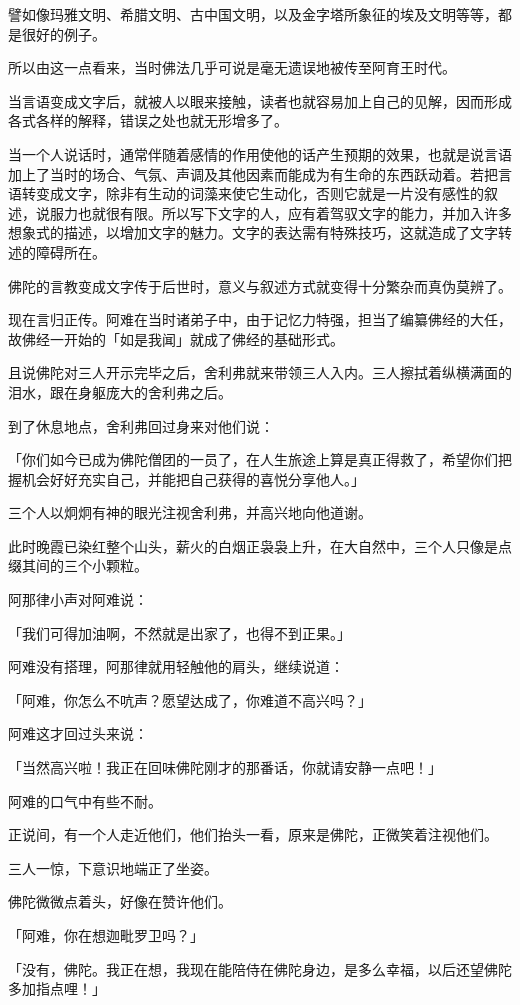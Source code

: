 \documentclass[twoside,openany]{book}
\begin{document}
譬如像玛雅文明、希腊文明、古中国文明，以及金字塔所象征的埃及文明等等，都是很好的例子。

所以由这一点看来，当时佛法几乎可说是毫无遗误地被传至阿育王时代。

当言语变成文字后，就被人以眼来接触，读者也就容易加上自己的见解，因而形成各式各样的解释，错误之处也就无形增多了。

当一个人说话时，通常伴随着感情的作用使他的话产生预期的效果，也就是说言语加上了当时的场合、气氛、声调及其他因素而能成为有生命的东西跃动着。若把言语转变成文字，除非有生动的词藻来使它生动化，否则它就是一片没有感性的叙述，说服力也就很有限。所以写下文字的人，应有着驾驭文字的能力，并加入许多想象式的描述，以增加文字的魅力。文字的表达需有特殊技巧，这就造成了文字转述的障碍所在。

佛陀的言教变成文字传于后世时，意义与叙述方式就变得十分繁杂而真伪莫辨了。

现在言归正传。阿难在当时诸弟子中，由于记忆力特强，担当了编纂佛经的大任，故佛经一开始的「如是我闻」就成了佛经的基础形式。

且说佛陀对三人开示完毕之后，舍利弗就来带领三人入内。三人擦拭着纵横满面的泪水，跟在身躯庞大的舍利弗之后。

到了休息地点，舍利弗回过身来对他们说：

「你们如今已成为佛陀僧团的一员了，在人生旅途上算是真正得救了，希望你们把握机会好好充实自己，并能把自己获得的喜悦分享他人。」

三个人以炯炯有神的眼光注视舍利弗，并高兴地向他道谢。

此时晚霞已染红整个山头，薪火的白烟正袅袅上升，在大自然中，三个人只像是点缀其间的三个小颗粒。

阿那律小声对阿难说：

「我们可得加油啊，不然就是出家了，也得不到正果。」

阿难没有搭理，阿那律就用轻触他的肩头，继续说道：

「阿难，你怎么不吭声？愿望达成了，你难道不高兴吗？」

阿难这才回过头来说：

「当然高兴啦！我正在回味佛陀刚才的那番话，你就请安静一点吧！」

阿难的口气中有些不耐。

正说间，有一个人走近他们，他们抬头一看，原来是佛陀，正微笑着注视他们。

三人一惊，下意识地端正了坐姿。

佛陀微微点着头，好像在赞许他们。

「阿难，你在想迦毗罗卫吗？」

「没有，佛陀。我正在想，我现在能陪侍在佛陀身边，是多么幸福，以后还望佛陀多加指点哩！」
\end{document}
